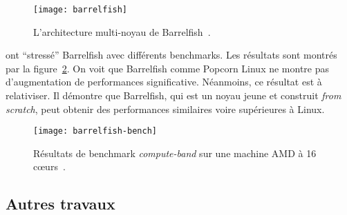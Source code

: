       \begin{figure}[ht]
        \centering \texttt{[image: barrelfish]}
        \caption{L'architecture multi-noyau de
          Barrelfish~\citep{baumann2009multikernel}.}
        \label{fig:barrelfish}
      \end{figure}

      \citeauthor{baumann2009multikernel} ont ``stressé'' Barrelfish avec
      différents benchmarks. Les résultats sont montrés par la
      figure~\ref{fig:barrelfish-bench}. On voit que Barrelfish comme Popcorn
      Linux ne montre pas d'augmentation de performances
      significative. Néanmoins, ce résultat est à relativiser. Il démontre que
      Barrelfish, qui est un noyau jeune et construit \textit{from scratch},
      peut obtenir des performances similaires voire supérieures à Linux.

      \begin{figure}[ht]
        \centering
        \texttt{[image: barrelfish-bench]}
        \caption{Résultats de benchmark \textit{compute-band} sur une machine
          AMD à 16 c\oe urs~\citep{baumann2009multikernel}.}
        \label{fig:barrelfish-bench}
      \end{figure}

    \subsection{Autres travaux}
    \label{subsec:others}
    

